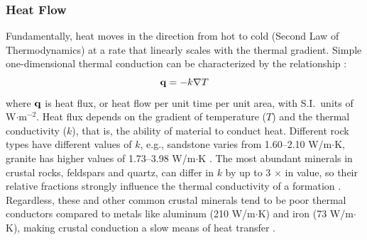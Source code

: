 \subsubsection{Heat Flow}\label{ch2:heatflow}
Fundamentally, heat moves in the direction from hot to cold (Second Law of Thermodynamics) at a rate that linearly scales with the thermal gradient. Simple one-dimensional thermal conduction can be characterized by the relationship \citep[Fourier's Law,][p.\ 270]{fowler_solid_2005}:
\begin{equation}\label{eq:conduction}
    {\bf q} = -k\nabla T
\end{equation}
where ${\bf q}$ is heat flux, or heat flow per unit time per unit area, with S.I.\ units of W$\cdot$m$^{-2}$. Heat flux depends on the gradient of temperature ($T$) and the thermal conductivity ($k$), that is, the ability of material to conduct heat. Different rock types have different values of $k$, e.g., sandstone varies from 1.60--2.10 W/m$\cdot$K, granite has higher values of 1.73--3.98 W/m$\cdot$K \citep[p.\ 30]{dipippo_geothermal_2012}. The most abundant minerals in crustal rocks, feldspars and quartz, can differ in $k$ by up to 3 $\times$ in value, so their relative fractions strongly influence the thermal conductivity of a formation \citep[p.\ 22]{glassley_geothermal_2015}. Regardless, these and other common crustal minerals tend to be poor thermal conductors compared to metals like aluminum (210 W/m$\cdot$K) and iron (73 W/m$\cdot$K), making crustal conduction a slow means of heat transfer \citep[p.\ 23]{dipippo_geothermal_2012}.

